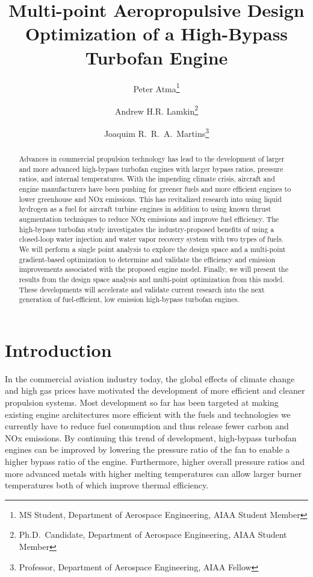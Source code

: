 \documentclass[conf]{new-aiaa}
\title{Multi-point Aeropropulsive Design Optimization of a High-Bypass Turbofan Engine} %
\author{Peter Atma\footnote{MS Student, Department of Aerospace Engineering, AIAA Student Member}}
\author{Andrew H.R. Lamkin\footnote{Ph.D.~Candidate, Department of Aerospace Engineering, AIAA Student Member}}
\author{Joaquim R.~R.~A.~Martins\footnote{Professor, Department of Aerospace Engineering, AIAA Fellow}}
\affil{University of Michigan, Ann Arbor, MI, 48109}
\begin{document}
\maketitle

\begin{abstract}
	Advances in commercial propulsion technology has lead to the development of larger and more advanced high-bypass turbofan engines with larger bypass ratios, pressure ratios, and internal temperatures.
	With the impending climate crisis, aircraft and engine manufacturers have been pushing for greener fuels and more efficient engines to lower greenhouse and NOx emissions.
	This has revitalized research into using liquid hydrogen as a fuel for aircraft turbine engines in addition to using known thrust augmentation techniques to reduce NOx emissions and improve fuel efficiency.
	The high-bypass turbofan study investigates the industry-proposed benefits of using a closed-loop water injection and water vapor recovery system with two types of fuels.
	We will perform a single point analysis to explore the design space and a multi-point gradient-based optimization to determine and validate the efficiency and emission improvements associated with the proposed engine model.
	Finally, we will present the results from the design space analysis and multi-point optimization from this model. These developments will accelerate and validate current research into the next generation of fuel-efficient, low emission high-bypass turbofan engines.
\end{abstract}

\section{Introduction}
In the commercial aviation industry today, the global effects of climate change and high gas prices have motivated the development of more efficient and cleaner propulsion systems.
Most development so far has been targeted at making existing engine architectures more efficient with the fuels and technologies we currently have to reduce fuel consumption and thus release fewer carbon and NOx emissions.
By continuing this trend of development, high-bypass turbofan engines can be improved by lowering the pressure ratio of the fan to enable a higher bypass ratio of the engine.
Furthermore, higher overall pressure ratios and more advanced metals with higher melting temperatures can allow larger burner temperatures both of which improve thermal efficiency.
\end{document}
